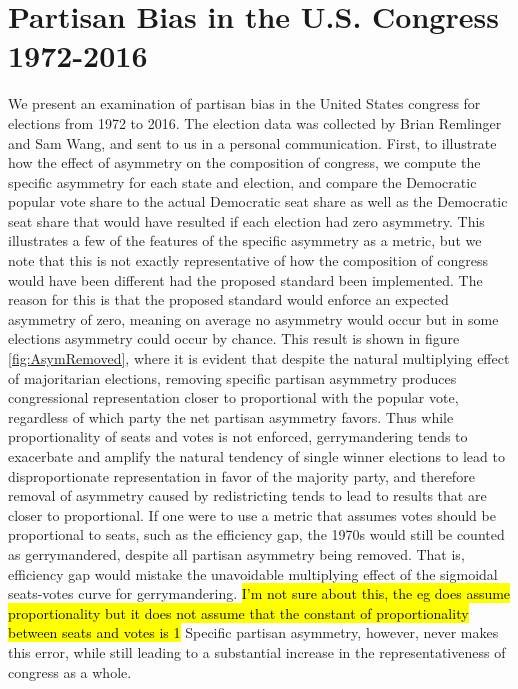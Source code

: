 \documentclass[preprint,12pt]{article}
\newcommand{\CM}[2][green]{ {\sethlcolor{#1} \hl{#2}} }
\begin{document}
\section{Partisan Bias in the U.S. Congress 1972-2016\label{sec:Hist}}
We present an examination of partisan bias in the United States congress for elections from 1972 to 2016.
The election data was collected by Brian Remlinger and Sam Wang, and sent to us in a personal communication.
First, to illustrate how the effect of asymmetry on the composition of congress, we compute the specific asymmetry for each state and election, and compare the Democratic popular vote share to the actual Democratic seat share as well as the Democratic seat share that would have resulted if each election had zero asymmetry.
This illustrates a few of the features of the specific asymmetry as a metric, but we note that this is not exactly representative of how the composition of congress would have been different had the proposed standard been implemented.
The reason for this is that the proposed standard would enforce an expected asymmetry of zero, meaning on average no asymmetry would occur but in some elections asymmetry could occur by chance.
This result is shown in figure \ref{fig:AsymRemoved}, where it is evident that despite the natural multiplying effect of majoritarian elections, removing specific partisan asymmetry produces congressional representation closer to proportional with the popular vote, regardless of which party the net partisan asymmetry favors.  
Thus while proportionality of seats and votes is not enforced, gerrymandering tends to exacerbate and amplify the natural tendency of single winner elections to lead to disproportionate representation in favor of the majority party, and therefore removal of asymmetry caused by redistricting tends to lead to results that are closer to proportional.
If one were to use a metric that assumes votes should be proportional to seats, such as the efficiency gap, the 1970s would still be counted as gerrymandered, despite all partisan asymmetry being removed.  
That is, efficiency gap would mistake the unavoidable multiplying effect of the sigmoidal seats-votes curve for gerrymandering.\CM{I'm not sure about this, the eg does assume proportionality but it does not assume that the constant of proportionality between seats and votes is 1}
Specific partisan asymmetry, however, never makes this error, while still leading to a substantial increase in the representativeness of congress as a whole.
\end{document}
